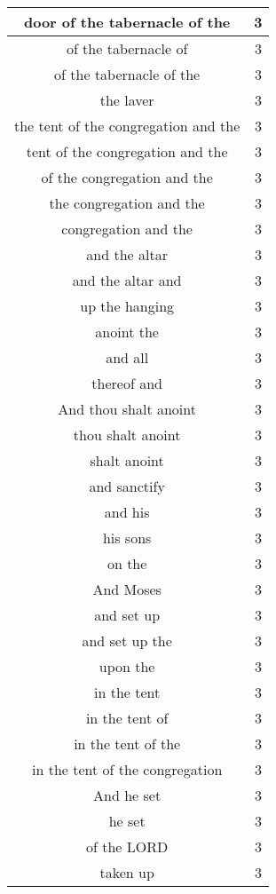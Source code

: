 \begin{center}
\begin{longtable}{|c|c|}
door of the tabernacle of the & 3\\ \hline 
of the tabernacle of & 3\\ \hline 
of the tabernacle of the & 3\\ \hline 
the laver & 3\\ \hline 
the tent of the congregation and the & 3\\ \hline 
tent of the congregation and the & 3\\ \hline 
of the congregation and the & 3\\ \hline 
the congregation and the & 3\\ \hline 
congregation and the & 3\\ \hline 
and the altar & 3\\ \hline 
and the altar and & 3\\ \hline 
up the hanging & 3\\ \hline 
anoint the & 3\\ \hline 
and all & 3\\ \hline 
thereof and & 3\\ \hline 
And thou shalt anoint & 3\\ \hline 
thou shalt anoint & 3\\ \hline 
shalt anoint & 3\\ \hline 
and sanctify & 3\\ \hline 
and his & 3\\ \hline 
his sons & 3\\ \hline 
on the & 3\\ \hline 
And Moses & 3\\ \hline 
and set up & 3\\ \hline 
and set up the & 3\\ \hline 
upon the & 3\\ \hline 
in the tent & 3\\ \hline 
in the tent of & 3\\ \hline 
in the tent of the & 3\\ \hline 
in the tent of the congregation & 3\\ \hline 
And he set & 3\\ \hline 
he set & 3\\ \hline 
of the LORD & 3\\ \hline 
taken up & 3\\ \hline 
\end{longtable}
\end{center}





